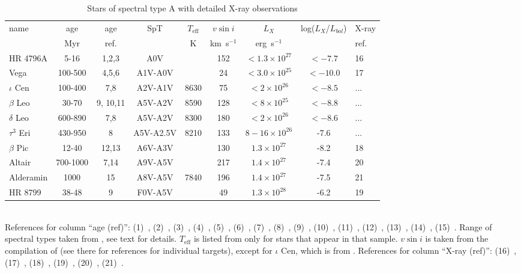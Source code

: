 \documentclass[preprint2]{aastex631}
\begin{document}
\begin{table}
\caption{Stars of spectral type A with detailed X-ray observations \label{tab}}
\begin{tabular}{lcccccccl}
  name      & age & age & SpT  & $T_\mathrm{eff}$ & $v\sin i$ & $L_X$ &   log($L_X$/$L_{bol}$) & X-ray\\
            & Myr & ref.&  & K & km~s$^{-1}$    & erg~s$^{-1}$  &  & ref. \\
\hline
HR 4796A    & 5-16 & 1,2,3   & A0V & & 152 & $<1.3\times 10^{27}$  & $< -7.7$ & 16\\
Vega  & 100-500 & 4,5,6   & A1V-A0V & & 24 & $<3.0\times 10^{25}$  & $< -10.0$& 17\\
$\iota$ Cen & 100-400 & 7,8 & A2V-A1V & 8630 & 75 & $<2\times 10^{26}$  & $< -8.5$ & ...\\
$\beta$ Leo & 30-70& 9, 10,11 & A5V-A2V & 8590 & 128 & $<8\times 10^{25}$  & $< -8.8$ & ...\\
$\delta$ Leo& 600-890 & 7,8 & A5V-A2V & 8300 & 180 & $<2\times 10^{26}$  & $< -8.6$ & ...\\
$\tau^3$ Eri & 430-950 & 8 & A5V-A2.5V & 8210 & 133 & $8-16\times 10^{26}$  & -7.6 & ...\\
$\beta$ Pic & 12-40 & 12,13 & A6V-A3V  & & 130 & $1.3\times10^{27}$   & -8.2  & 18\\
Altair    & 700-1000 & 7,14  & A9V-A5V  & & 217 &  $1.4\times10^{27}$   & -7.4     &  20\\
Alderamin & 1000 & 15  & A8V-A5V & 7840 & 196 & $1.4\times10^{27}$ & -7.5 & 21\\
HR 8799   & 38-48 & 9    & F0V-A5V  & & 49 & $1.3\times10^{28}$   & -6.2     &  19\\

\hline
\end{tabular}\\
References for column ``age (ref)'':
(1)~\citet{1999ApJ...512L..63W},
(2)~\citet{2013ApJ...767...96W},
(3)~\citet{2014ApJ...786..136D},
(4)~\citet{1998A&A...339..831B},
(5)~\citet{2010ApJ...712..250H},
(6)~\citet{2010ApJ...708...71Y},
(7)~\citet{2012AJ....143..135V},
(8)~\citet{2015ApJ...804..146D},
(9)~\citet{2015MNRAS.454..593B},
(10)~\citet{2019ApJ...870...27Z},
(11)~\citet{2019MNRAS.489.2189L},
(12)~\citet{2001ApJ...562L..87Z},
(13)~\citet{2010ApJ...723.1599M},
(14)~\citet{2018AJ....156..286S},
(15)~\citet{2009ApJ...701..209Z}.
Range of spectral types taken from \citet{2014yCat....1.2023S}, see text for details. $T_\mathrm{eff}$ is listed from \citet{2002ApJ...579..800S} only for stars that appear in that sample. $v \sin i$ is taken from the compilation of \citet{2002A&A...393..897R} (see there for references for individual targets), except for $\iota$ Cen, which is from \cite{2002ApJ...579..800S}. References for column ``X-ray (ref)'':
(16)~\citet{2014ApJ...786..136D},
(17)~\citet{2006ApJ...636..426P},
(18)~\citet{2012ApJ...750...78G},
(19)~\citet{2010A&A...516A..38R},
(20)~{\citet{2009A&A...497..511R}},
(21)~\cite{2002ApJ...579..800S}.
\end{table}
\end{document}
